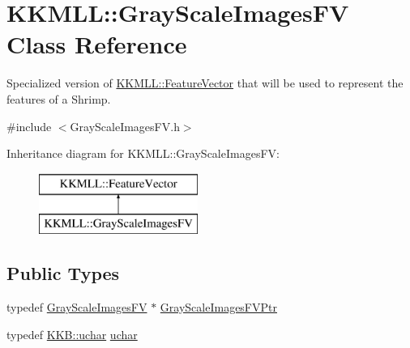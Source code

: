 \hypertarget{class_k_k_m_l_l_1_1_gray_scale_images_f_v}{}\section{K\+K\+M\+LL\+:\+:Gray\+Scale\+Images\+FV Class Reference}
\label{class_k_k_m_l_l_1_1_gray_scale_images_f_v}


Specialized version of \hyperlink{class_k_k_m_l_l_1_1_feature_vector}{K\+K\+M\+L\+L\+::\+Feature\+Vector} that will be used to represent the features of a Shrimp.  




{\ttfamily \#include $<$Gray\+Scale\+Images\+F\+V.\+h$>$}

Inheritance diagram for K\+K\+M\+LL\+:\+:Gray\+Scale\+Images\+FV\+:\begin{figure}[H]
\begin{center}
\leavevmode
\includegraphics[height=2.000000cm]{class_k_k_m_l_l_1_1_gray_scale_images_f_v}
\end{center}
\end{figure}
\subsection*{Public Types}
\begin{DoxyCompactItemize}
\item 
typedef \hyperlink{class_k_k_m_l_l_1_1_gray_scale_images_f_v}{Gray\+Scale\+Images\+FV} $\ast$ \hyperlink{class_k_k_m_l_l_1_1_gray_scale_images_f_v_af5c112fdba5e66d936a4bb19b14f41a9}{Gray\+Scale\+Images\+F\+V\+Ptr}
\item 
typedef \hyperlink{namespace_k_k_b_ace9969169bf514f9ee6185186949cdf7}{K\+K\+B\+::uchar} \hyperlink{class_k_k_m_l_l_1_1_gray_scale_images_f_v_a6c8ed7cb47a08ad34c89fb721b97cdcc}{uchar}
\end{DoxyCompactItemize}
